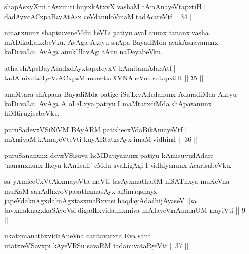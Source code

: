 \begin{shl}
shapAsxyXmi tAvxmiti huyxkAtxvX vashaM tAmAnayeVtapxtiH | \\
dadAyxcACxpaBayAtAsx ceVdanuloVmaM tadA\s \s careVtf \hfill|| 34 || 
\end{shl}

\begin{artha}
ninanxnunx shapisuveneMdu heVLi patiyu avaLanunx tananx vasha 
mADikoLaLxbeVku. AvAga Akeyu shApa BayadiMda avakAshavanunx koDuvaLu. 
AvAga anukUlavAgi tAnu naDeyabeVku.
\end{artha}


\begin{shl}
atha shApaBayAdadxdAyxtapxteyxV kAmitamAdarAtf | \\
tadA nivataRyeVcACxpaM manetxrXVNAneVna satapxtiH \hfill|| 35 || 
\end{shl}

\begin{artha}
anaMtara shApada BayadiMda patige iSaTxvAdudanunx AdaradiMda Akeyu 
koDuvaLu. AvAga A oLeLxya patiyu I maMtarxdiMda shApavanunx 
hiMtirugisabeVku.
\end{artha}


\begin{shl}
puruSadevxVSiNiVM BAyARM patishecxVdaBikAmayeVtf | \\
mAmiyaM kAmayeVteVti kuyARtatxsAyx imaM vidhimf \hfill|| 36 || 
\end{shl}

\begin{artha}
puruSananunx devxVSisuva heMDatiyanunx patiyu kAmisuvudAdare 
`nananxnunx Ikeyu kAmisali' eMdu avaLigAgi I vidhiyanunx AcarisabeVku.
\end{artha}


\begin{shl}
sa yAmiceCxVtAkxmayeVta meVti tasAyxmathaRM niSAThxya muKeVna muKaM sanAdhxyoVpasathxmasAyx aBimaqshayx japeVdaknAgxdaknAgxtasxmaBxvasi haqdayAdadhijAyaseV ||sa tavxmaknagxkaSAyoV\s si digadhxvidadhxmiva mAdayeVmAmamUM mayiVti || 9 ||
\end{shl}


\begin{shl}
ukatxmanathxvidhAneVna  caritavarxta Eva sanf | \\
utatxreVSavxpi kAyeVRSu savaRM tadanuvataRyeVtf \hfill|| 37 || 
\end{shl}

